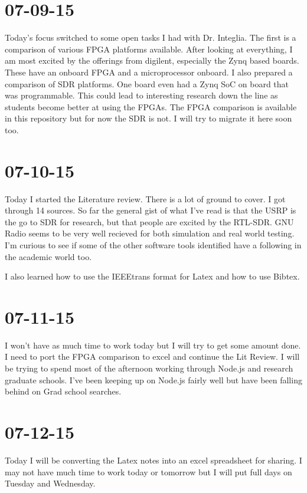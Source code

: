 \documentclass{article}
\begin{document}
	\section{07-09-15}
	Today's focus switched to some open tasks I had with Dr. Integlia. The first is a comparison of various FPGA platforms
	available. After looking at everything, I am most excited by the offerings from digilent, especially the Zynq based boards.
	These have an onboard FPGA and a microprocessor onboard. I also prepared a comparison of SDR platforms. One board even 
	had a Zynq SoC on board that was programmable. This could lead to interesting research down the line as students become
	better at using the FPGAs. The FPGA comparison is available in this repository but for now the SDR is not. I will try
	to migrate it here soon too.

	\section{07-10-15}
	Today I started the Literature review. There is a lot of ground to cover. I got through 14 sources. So far the general
	gist of what I've read is that the USRP is the go to SDR for research, but that people are excited by the RTL-SDR. 
	GNU Radio seems to be very well recieved for both simulation and real world testing. I'm curious to see if some of the
	other software tools identified have a following in the academic world too. 

	I also learned how to use the IEEEtrans format for Latex and how to use Bibtex.

	\section{07-11-15}
	I won't have as much time to work today but I will try to get some amount done. I need to port the FPGA comparison
	to excel and continue the Lit Review. I will be trying to spend most of the afternoon working through Node.js and 
	research graduate schools. I've been keeping up on Node.js fairly well but have been falling behind on Grad school 
	searches. 

	\section{07-12-15}
	Today I will be converting the Latex notes into an excel spreadsheet for sharing. I may not have much time to work
	today or tomorrow but I will put full days on Tuesday and Wednesday. 
\end{document}
